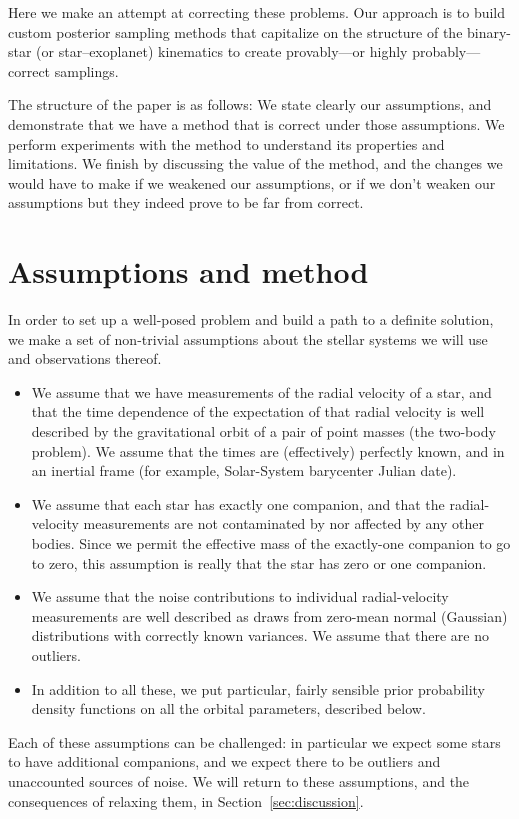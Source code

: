 \documentclass[manuscript, letterpaper]{aastex6}
\begin{document}
Here we make an attempt at correcting these problems.
Our approach is to build custom posterior sampling methods that
capitalize on the structure of the binary-star (or star--exoplanet)
kinematics to create provably---or highly probably---correct
samplings.

The structure of the paper is as follows:
We state clearly our assumptions, and demonstrate that we have a
method that is correct under those assumptions.
We perform experiments with the method to understand its properties
and limitations.
We finish by discussing the value of the method, and the changes we
would have to make if we weakened our assumptions, or if we don't
weaken our assumptions but they indeed prove to be far from correct.

\section{Assumptions and method} \label{sec:method}

In order to set up a well-posed problem and build a path to a
definite solution, we make a set of non-trivial assumptions about the
stellar systems we will use and observations thereof.
\begin{itemize}
\item We assume that we have measurements of the radial velocity of a
  star, and that the time dependence of the expectation of that radial
  velocity is well described by the gravitational orbit of a pair of
  point masses (the two-body problem). We assume that the times are
  (effectively) perfectly known, and in an inertial frame (for
  example, Solar-System barycenter Julian date).
\item We assume that each star has exactly one companion, and that the
  radial-velocity measurements are not contaminated by nor affected by
  any other bodies. Since we permit the effective mass of the
  exactly-one companion to go to zero, this assumption is really that
  the star has zero or one companion.
\item We assume that the noise contributions to individual
  radial-velocity measurements are well described as draws from
  zero-mean normal (Gaussian) distributions with correctly known
  variances. We assume that there are no outliers.
\item In addition to all these, we put particular, fairly sensible
  prior probability density functions on all the orbital parameters,
  described below.
\end{itemize}
Each of these assumptions can be challenged: in particular we expect some stars
to have additional companions, and we expect there to be outliers and
unaccounted sources of noise.
We will return to these assumptions, and the consequences of relaxing them, in
Section~\ref{sec:discussion}.
\end{document}
